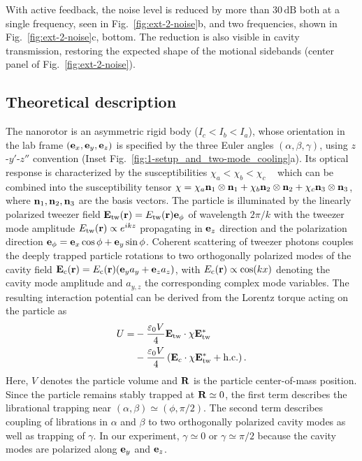 \documentclass[reprint, amsmath, amssymb, superscriptaddress,showkeys,aps,pra]{revtex4-2}
\begin{document}
With active feedback, the noise level is reduced by more than $30\,\text{dB}$ both at a single frequency, seen in Fig.~\ref{fig:ext-2-noise}b, and two frequencies, shown in Fig.~\ref{fig:ext-2-noise}c, bottom. The reduction is also visible in cavity transmission, restoring the expected shape of the motional sidebands (center panel of Fig.~\ref{fig:ext-2-noise}). 


\subsection{Theoretical description}
The nanorotor is an asymmetric rigid body ($I_c<I_b<I_a$), whose orientation in the lab frame $({\bf e}_x, {\bf e}_y, {\bf e}_z)$ is specified by the three Euler angles $(\alpha,\beta, \gamma)$, using $z$-$y'$-$z''$ convention (Inset Fig.~\ref{fig:1-setup_and_two-mode_cooling}a). 
Its optical response is characterized by the susceptibilities $\chi_a < \chi_b < \chi_c$ ~\cite{rudolph_theory_2021} which can be combined into the susceptibility tensor $\chi=\chi_a{\bf n}_1 \otimes {\bf n}_1+\chi_b{\bf n}_2 \otimes {\bf n}_2+\chi_c{\bf n}_3 \otimes {\bf n}_3$, where ${\bf n}_1,{\bf n}_2, {\bf n}_3$ are the basis vectors. 
The particle is illuminated by the linearly polarized tweezer field ${\bf E}_{\rm tw}({\bf r}) = E_{\rm tw}({\bf r}) {\bf e}_\phi$ of wavelength $2\pi/k$ with the tweezer mode amplitude $E_{\rm tw}({\bf r})\propto e^{i k z}$ propagating in ${\bf e}_z$ direction and the polarization direction ${\bf e}_\phi = {\bf e}_x \cos \phi + {\bf e}_y \sin \phi$. Coherent scattering of tweezer photons couples the deeply trapped particle rotations to two orthogonally polarized modes of the cavity field ${\bf E}_{\rm c}({\bf r}) = E_{\rm c}({\bf r}) ({\bf e}_y a_y + {\bf e}_z a_z)$, with $E_{\rm c}({\bf r}) \propto \cos(kx)$ denoting the cavity mode amplitude and $a_{y,z}$ the corresponding complex mode variables. The resulting interaction potential can be derived from the Lorentz torque acting on the particle as \cite{stickler_rotranslational_2016,rudolph_theory_2021,schafer_cooling_2021}
\begin{align}\label{eq:potentialfull}
    U = & -\frac{\varepsilon_0 V}{4} {\bf E}_{\rm tw} \cdot \chi {\bf E}_{\rm tw}^* \nonumber \\
    & - \frac{\varepsilon_0 V}{4} \left ( {\bf E}_c \cdot \chi {\bf E}_{\rm tw}^* + {\rm h.c.}\right ).
\end{align}
Here, $V$ denotes the particle volume and ${\bf R}$ is the particle center-of-mass position. Since the particle remains stably trapped at ${\bf R} \simeq 0$, the first term describes the librational trapping near $(\alpha,\beta) \simeq (\phi,\pi/2)$. The second term describes coupling of librations in $\alpha$ and $\beta$ to two orthogonally polarized cavity modes as well as trapping of $\gamma$. In our experiment, $\gamma \simeq 0$ or $\gamma \simeq \pi/2$ because the cavity modes are polarized along ${\bf e}_y$ and ${\bf e}_z$. 
\end{document}
